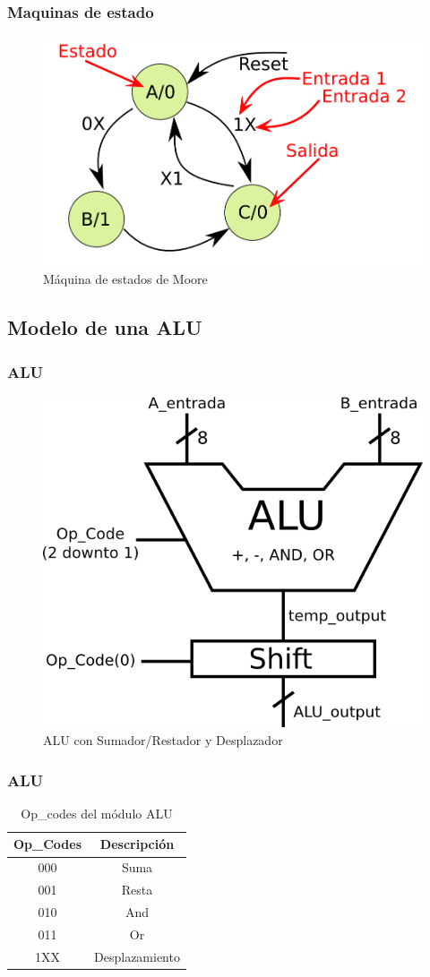 \documentclass{beamer}
\begin{document}
\begin{frame}
\frametitle{Maquinas de estado}
 \begin{figure}[h]
  \centering
    \includegraphics[width=.7\textwidth]{graficos/moore3.png}
  \caption{Máquina de estados de Moore}
\end{figure}
\end{frame}

\subsection{Modelo de una ALU}
\begin{frame}
\frametitle{ALU}
 \begin{figure}[h]
  \centering
    \includegraphics[width=.5\textwidth]{graficos/alu.png}
  \caption{ALU con Sumador/Restador y Desplazador}
\end{figure}

\end{frame}

\begin{frame}
\frametitle{ALU}
\begin{table}[!hbt] 
\centering
 \begin{tabular}{|c|c|}
\hline
\textbf{Op\_Codes} & \textbf{Descripción} \\ \hline
000 & Suma \\ \hline
001 & Resta \\ \hline
010 & And \\ \hline
011 & Or \\ \hline
1XX & Desplazamiento \\ \hline
\end{tabular}
  \caption{Op\_codes del módulo ALU}
\end{table}  
\end{frame}
\end{document}
